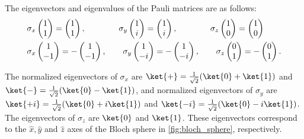 The eigenvectors and eigenvalues of the Pauli matrices are as follows:
\begin{align*}
 & \sigma_{x} \begin{pmatrix} 1 \\ 1 \end{pmatrix} = \begin{pmatrix} 1 \\ 1 \end{pmatrix}, \hspace{1.4cm} \sigma_{y} \begin{pmatrix} 1 \\ i \end{pmatrix} =  \begin{pmatrix} 1 \\ i \end{pmatrix}, \hspace{1.4cm} \sigma_{z} \begin{pmatrix} 1 \\ 0 \end{pmatrix} = \begin{pmatrix} 1 \\ 0 \end{pmatrix} \\
  & \sigma_{x} \begin{pmatrix} 1 \\ -1 \end{pmatrix} = -\begin{pmatrix} 1 \\ -1 \end{pmatrix}, \hspace{0.7cm} \sigma_{y} \begin{pmatrix} 1 \\ -i \end{pmatrix} = -\begin{pmatrix} 1 \\ -i \end{pmatrix}, \hspace{0.7cm} \sigma_{z} \begin{pmatrix} 0 \\ 1 \end{pmatrix} = -\begin{pmatrix} 0 \\ 1 \end{pmatrix}.
\end{align*}

The normalized eigenvectors of $\sigma_x$ are $\ket{+} = \frac{1}{\sqrt{2}}(\ket{0} + \ket{1})$ and $\ket{-} = \frac{1}{\sqrt{2}}(\ket{0} - \ket{1})$, and normalized eigenvectors of $\sigma_y$ are $\ket{+i} = \frac{1}{\sqrt{2}}(\ket{0} + i\ket{1})$ and $\ket{-i} = \frac{1}{\sqrt{2}}(\ket{0} - i\ket{1})$. The eigenvectors of $\sigma_z$ are $\ket{0}$ and $\ket{1}$. These eigenvectors correspond to the $\hat{x}, \hat{y}$ and $\hat{z}$ axes of the Bloch sphere in \autoref{fig:bloch_sphere}, respectively.

